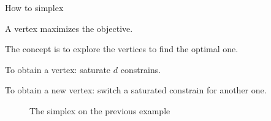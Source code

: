 \begin{frame}{How to simplex}
\begin{theorem}
A vertex maximizes the objective.
\end{theorem}
The concept is to explore the vertices to find the optimal one.

To obtain a vertex: saturate $d$ constrains.

To obtain a new vertex: switch a saturated constrain for another one.

\begin{figure}
\caption{The simplex on the previous example}
\end{figure}  

\end{frame}

